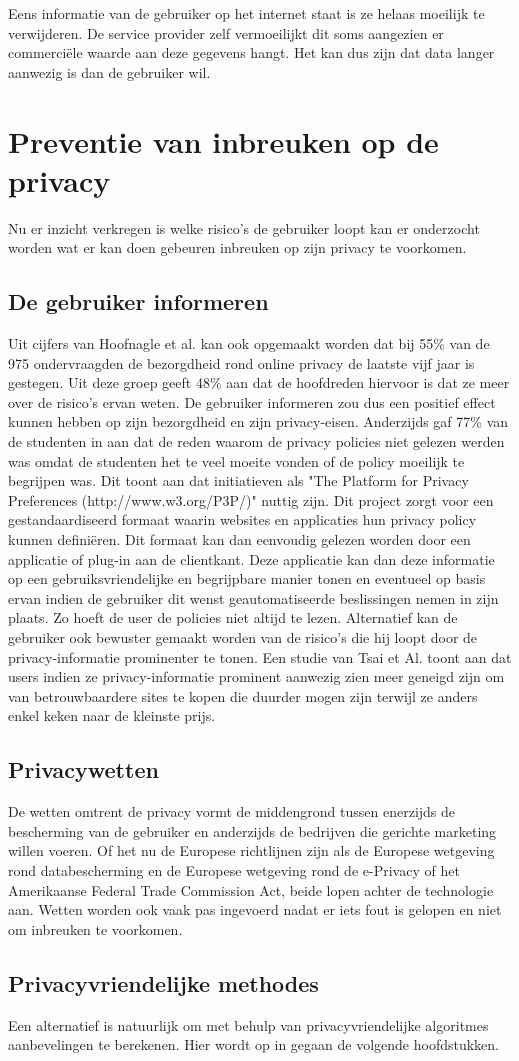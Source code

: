 Eens informatie van de gebruiker op het internet staat is ze helaas moeilijk te verwijderen. De service provider zelf vermoeilijkt dit soms aangezien er commerci\"ele waarde aan deze gegevens hangt. Het kan dus zijn dat data langer aanwezig is dan de gebruiker wil.


\section{Preventie van inbreuken op de privacy}
Nu er inzicht verkregen is welke risico's de gebruiker loopt kan er onderzocht worden wat er kan doen gebeuren inbreuken op zijn privacy te voorkomen.

\subsection{De gebruiker informeren}

Uit cijfers van Hoofnagle et al. \cite{hoofnagle} kan ook opgemaakt worden dat bij 55\% van de 975 ondervraagden de bezorgdheid rond online privacy de laatste vijf jaar is gestegen. Uit deze groep geeft 48\% aan dat de hoofdreden hiervoor is dat ze meer over de risico's ervan weten. De gebruiker informeren zou dus een positief effect kunnen hebben op zijn bezorgdheid en zijn privacy-eisen. Anderzijds gaf 77\% van de studenten in \cite{privdisc} aan dat de reden waarom de privacy policies niet gelezen werden was omdat de studenten het te veel moeite vonden of de policy moeilijk te begrijpen was. Dit toont aan dat initiatieven als "The Platform for Privacy Preferences (http://www.w3.org/P3P/)" nuttig zijn. Dit project zorgt voor een gestandaardiseerd formaat waarin websites en applicaties hun privacy policy kunnen defini\"eren. Dit formaat kan dan eenvoudig gelezen worden door een applicatie of plug-in aan de clientkant. Deze applicatie kan dan deze informatie op een gebruiksvriendelijke en begrijpbare manier tonen en eventueel op basis ervan indien de gebruiker dit wenst geautomatiseerde beslissingen nemen in zijn plaats. Zo hoeft de user de policies niet altijd te lezen. Alternatief kan de gebruiker ook bewuster gemaakt worden van de risico's die hij loopt door de privacy-informatie prominenter te tonen. Een studie van Tsai et Al. \cite{tsaitsai} toont aan dat users indien ze privacy-informatie prominent aanwezig zien meer geneigd zijn om van betrouwbaardere sites te kopen die duurder mogen zijn terwijl ze anders enkel keken naar de kleinste prijs. 

\subsection{Privacywetten}
De wetten omtrent de privacy vormt de middengrond tussen enerzijds de bescherming van de gebruiker en anderzijds de bedrijven die gerichte marketing willen voeren. Of het nu de Europese richtlijnen zijn als de Europese wetgeving rond databescherming en de Europese wetgeving rond de e-Privacy of het Amerikaanse Federal Trade Commission Act, beide lopen achter de technologie aan. Wetten worden ook vaak pas ingevoerd  nadat er iets fout is gelopen en niet om inbreuken te voorkomen.

\subsection{Privacyvriendelijke methodes}
Een alternatief is natuurlijk om met behulp van privacyvriendelijke algoritmes aanbevelingen te berekenen. Hier wordt op in gegaan de volgende hoofdstukken.

